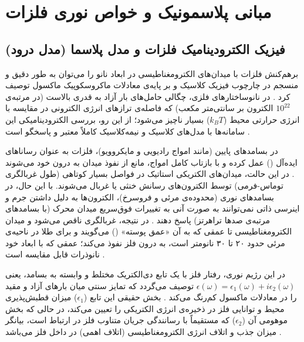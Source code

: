 \documentclass[12pt,a4paper]{report}
\begin{document}
\chapter{مبانی پلاسمونیک و خواص نوری فلزات}

\section{فیزیک الکترودینامیک فلزات و مدل پلاسما (مدل درود)}
برهم‌کنش فلزات با میدان‌های الکترومغناطیسی در ابعاد نانو را می‌توان به طور دقیق و منسجم در چارچوب فیزیک کلاسیک و بر پایه‌ی معادلات ماکروسکوپیک ماکسول توصیف کرد \cite{maier,novotny}. در نانوساختارهای فلزی، چگالی حامل‌های بار آزاد به قدری بالاست (در مرتبه‌ی $10^{22}$ الکترون بر سانتی‌متر مکعب) که فاصله‌ی ترازهای انرژی الکترونی در مقایسه با انرژی حرارتی محیط ($k_BT$) بسیار ناچیز می‌شود؛ از این رو، بررسی الکترودینامیکی این سامانه‌ها با مدل‌های کلاسیک و نیمه‌کلاسیک کاملاً معتبر و پاسخگو است \cite{maier}.

در بسامدهای پایین (مانند امواج رادیویی و مایکروویو)، فلزات به عنوان رساناهای ایده‌آل () عمل کرده و با بازتاب کامل امواج، مانع از نفوذ میدان به درون خود می‌شوند \cite{novotny,maier}. در این حالت، میدان‌های الکتریکی استاتیک در فواصل بسیار کوتاهی (طول غربالگری توماس-فرمی) توسط الکترون‌های رسانش خنثی یا غربال می‌شوند. با این حال، در بسامدهای نوری (محدوده‌ی مرئی و فروسرخ)، الکترون‌ها به دلیل داشتن جرم و اینرسی ذاتی نمی‌توانند به صورت آنی به تغییرات فوق‌سریع میدان محرک (با بسامدهای مرتبه‌ی صدها تراهرتز) پاسخ دهند \cite{maier}. در نتیجه، غربالگری ناقص می‌شود و میدان الکترومغناطیسی تا عمقی که به آن «عمق پوسته» () می‌گویند و برای طلا در ناحیه‌ی مرئی حدود ۲۰ تا ۳۰ نانومتر است، به درون فلز نفوذ می‌کند؛ عمقی که با ابعاد خود نانوذرات قابل مقایسه است \cite{maier,novotny}.

در این رژیم نوری، رفتار فلز با یک تابع دی‌الکتریک مختلط و وابسته به بسامد، یعنی $\epsilon(\omega)=\epsilon_1(\omega)+i\epsilon_2(\omega)$ توصیف می‌گردد که تمایز سنتی میان بارهای آزاد و مقید را در معادلات ماکسول کم‌رنگ می‌کند \cite{maier}. بخش حقیقی این تابع ($\epsilon_1$) میزان قطبش‌پذیری محیط و توانایی فلز در ذخیره‌ی انرژی الکتریکی را تعیین می‌کند، در حالی که بخش موهومی آن ($\epsilon_2$) که مستقیماً با رسانندگی جریان متناوب فلز در ارتباط است، بیانگر میزان جذب و اتلاف انرژی الکترومغناطیسی (اتلاف اهمی) در داخل فلز می‌باشد \cite{maier,novotny}.
\end{document}
